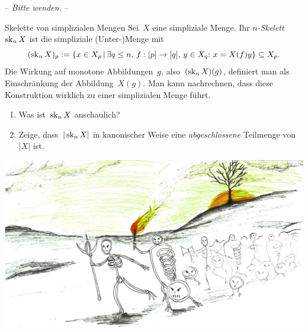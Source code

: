 \documentclass{uebblatt}
\begin{document}
\begin{center}-- \emph{Bitte wenden.} --\end{center}

\newpage

\begin{aufgabe}{Skelette von simplizialen Mengen}
Sei~$X$ eine simpliziale Menge. Ihr \emph{$n$-Skelett}~$\operatorname{sk}_n X$ ist die
simpliziale (Unter-)Menge mit
\[ (\sk_n X)_p := \{ x \in X_p \,|\,
  \exists q \leq n,\, f : [p] \to [q],\, y \in X_q{:}\ 
  x = X(f)y \} \subseteq X_p. \]
Die Wirkung auf monotone Abbildungen~$g$, also~$(\operatorname{sk}_n X)(g)$, definiert man als
Einschränkung der Abbildung~$X(g)$. Man kann nachrechnen, dass diese
Konstruktion wirklich zu einer simplizialen Menge führt.

\begin{enumerate}
\item Was ist~$\operatorname{sk}_n X$ anschaulich?
\item Zeige, dass~$|\operatorname{sk}_n X|$ in kanonischer Weise eine \emph{abgeschlossene}
Teilmenge von~$|X|$ ist.
\end{enumerate}
\end{aufgabe}

\begin{center}
  \includegraphics{knotenarmee}
\end{center}
\end{document}
